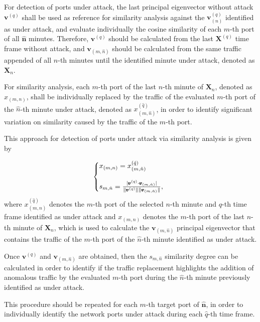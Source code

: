 For detection of ports under attack, the last principal eigenvector without attack $\pmb{v}^{(q)}$ shall be used as reference for similarity analysis against the $\pmb{v}_{(n)}^{(q)}$ identified as under attack, and evaluate individually the cosine similarity of each $m$-th port of all $\hat{\pmb{n}}$ minutes. Therefore, $\pmb{v}^{(q)}$ should be calculated from the last $\pmb{X}^{(q)}$ time frame without attack, and $\pmb{v}_{(m,\hat{n})}$ should be calculated from the same traffic appended of all $n$-th minutes until the identified minute under attack, denoted as $\pmb{X}_n$. 

For similarity analysis, each $m$-th port of the last $n$-th minute of $\pmb{X}_n$, denoted as $x_{(m,n)}$, shall be individually replaced by the traffic of the evaluated $m$-th port of the $\hat{n}$-th minute under attack, denoted as $x^{(\hat{q})}_{(m,\hat{n})}$, in order to identify significant variation on similarity caused by the traffic of the $m$-th port. 

This approach for detection of ports under attack via similarity analysis is given by

\begin{equation}\label{eq:2.15}
  \left\{
  \begin{array}{@{}ll@{}}
    x_{(m,n)} = x^{(\hat{q})}_{(m,\hat{n})} \\
    \\
    s_{m,\hat{n}} = \frac{\abs{\pmb{v}^{(q)} \cdot \pmb{v}_{(m,\hat{n})}}}{\norm{\pmb{v}^{(q)}}\norm{\pmb{v}_{(m,\hat{n})}}},
  \end{array}\right.
\end{equation}
where $x^{(\hat{q})}_{(m,\hat{n})}$ denotes the $m$-th port of the selected $n$-th minute and $q$-th time frame identified as under attack and $x_{(m,n)}$ denotes the $m$-th port of the last $n$-th minute of $\pmb{X}_n$, which is used to calculate the $\pmb{v}_{(m,\hat{n})}$ principal eigenvector that contains the traffic of the $m$-th port of the $\hat{n}$-th minute identified as under attack.

Once $\pmb{v}^{(q)}$ and $\pmb{v}_{(m,\hat{n})}$ are obtained, then the $s_{m,\hat{n}}$ similarity degree can be calculated in order to identify if the traffic replacement highlights the addition of anomalous traffic by the evaluated $m$-th port during the $\hat{n}$-th minute previously identified as under attack. 

This procedure should be repeated for each $m$-th target port of $\hat{\pmb{n}}$, in order to individually identify the network ports under attack during each $\hat{q}$-th time frame.


